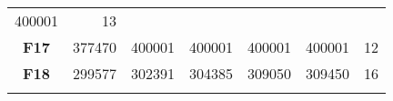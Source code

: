 \documentclass[12pt,a4paper]{article}
\begin{document}
\begin{longtable}[c]{@{}crrrrrr@{}}
\begin{minipage}[t]{0.11\columnwidth}
400001
\strut\end{minipage} &
\begin{minipage}[t]{0.07\columnwidth}\raggedleft\strut
13
\strut\end{minipage}\tabularnewline
\begin{minipage}[t]{0.11\columnwidth}\centering\strut
\textbf{F17}
\strut\end{minipage} &
\begin{minipage}[t]{0.08\columnwidth}\raggedleft\strut
377470
\strut\end{minipage} &
\begin{minipage}[t]{0.08\columnwidth}\raggedleft\strut
400001
\strut\end{minipage} &
\begin{minipage}[t]{0.09\columnwidth}\raggedleft\strut
400001
\strut\end{minipage} &
\begin{minipage}[t]{0.10\columnwidth}\raggedleft\strut
400001
\strut\end{minipage} &
\begin{minipage}[t]{0.11\columnwidth}\raggedleft\strut
400001
\strut\end{minipage} &
\begin{minipage}[t]{0.07\columnwidth}\raggedleft\strut
12
\strut\end{minipage}\tabularnewline
\begin{minipage}[t]{0.11\columnwidth}\centering\strut
\textbf{F18}
\strut\end{minipage} &
\begin{minipage}[t]{0.08\columnwidth}\raggedleft\strut
299577
\strut\end{minipage} &
\begin{minipage}[t]{0.08\columnwidth}\raggedleft\strut
302391
\strut\end{minipage} &
\begin{minipage}[t]{0.09\columnwidth}\raggedleft\strut
304385
\strut\end{minipage} &
\begin{minipage}[t]{0.10\columnwidth}\raggedleft\strut
309050
\strut\end{minipage} &
\begin{minipage}[t]{0.11\columnwidth}\raggedleft\strut
309450
\strut\end{minipage} &
\begin{minipage}[t]{0.07\columnwidth}\raggedleft\strut
16
\strut\end{minipage}\tabularnewline
\begin{minipage}[t]{0.11\columnwidth}\centering\strut

\end{minipage}
\end{longtable}
\end{document}
